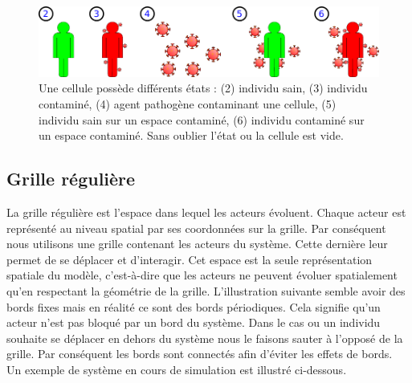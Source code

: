 \begin{figure}[h]
	\centering
	\captionsetup{justification=centering}
	\includegraphics[scale=0.7]{Images/cell_states.pdf}
	\caption[Différents états de la cellule]{Une cellule possède différents états : (2) individu sain, (3) individu contaminé, (4) agent pathogène contaminant une cellule, (5) individu sain sur un espace contaminé, (6) individu contaminé sur un espace contaminé. Sans oublier l'état ou la cellule est vide.  }
\end{figure}

\newpage

\subsection{Grille régulière}

La grille régulière est l'espace dans lequel les acteurs évoluent. Chaque acteur est représenté au niveau spatial par ses coordonnées sur la grille. Par conséquent nous utilisons une grille contenant les acteurs du système. Cette dernière leur permet de se déplacer et d'interagir. Cet espace est la seule représentation spatiale du modèle, c'est-à-dire que les acteurs ne peuvent évoluer spatialement qu'en respectant la géométrie de la grille. L'illustration suivante semble avoir des bords fixes mais en réalité ce sont des bords périodiques. Cela signifie qu'un acteur n'est pas bloqué par un bord du système. Dans le cas ou un individu souhaite se déplacer en dehors du système nous le faisons sauter à l'opposé de la grille. Par conséquent les bords sont connectés afin d'éviter les effets de bords. \\

Un exemple de système en cours de simulation est illustré ci-dessous.

